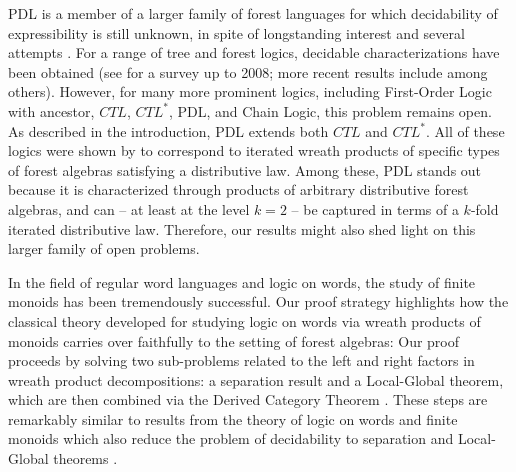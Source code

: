\documentclass[sigplan,9pt]{acmart}\settopmatter{printfolios=true,printccs=false,printacmref=false}
\newcounter{theorem}
\theoremstyle{definition}
\begin{document}
PDL is a member of a larger family of forest languages for which decidability of expressibility is still unknown, in spite of longstanding interest and several attempts \cite{thomas-logical-1984,  potthoff-first-order-1995}. %
For a range of tree and forest logics, decidable characterizations have been obtained (see \cite{bojanczyk-effective-2008} for a survey up to 2008; more recent results include \cite{bojanczyk-piecewise-2012,bojanczyk-tree-2010,place-deciding-2010,place-decidable-2009,benedikt-regular-2009} among others).
However, for many more prominent logics, including First-Order Logic with ancestor, $CTL$, $CTL^*$, PDL, and Chain Logic, this problem remains open.
As described in the introduction, PDL extends both $CTL$ and $CTL^*$.
All of these logics were shown by \cite{bojanczyk-wreath-2012} to correspond to iterated wreath products of specific types of forest algebras satisfying a distributive law.
Among these, PDL stands out because it is characterized through products of arbitrary distributive forest algebras, and can -- at least at the level $k = 2$ -- be captured in terms of a $k$-fold iterated distributive law.
Therefore, our results might also shed light on this larger family of open problems.



In the field of regular word languages and logic on words, the study of finite monoids has been tremendously successful.
Our proof strategy highlights how the classical theory developed for studying logic on words via wreath products of monoids carries over faithfully to the setting of forest algebras:
Our proof proceeds by solving two sub-problems related to the left and right factors in wreath product decompositions: a separation result and a Local-Global theorem, which are then combined via the Derived Category Theorem \cite{tilson-categories-1987}.
These steps are remarkably similar to results from the theory of logic on words and finite monoids which also reduce the problem of decidability to separation \cite{place-going-2014} and Local-Global theorems \cite{krebs-effective-2012}.



%

\end{document}
